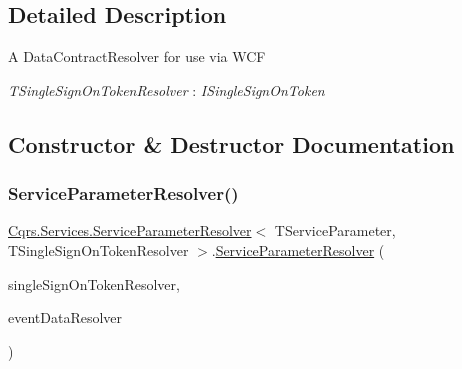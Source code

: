 \subsection{Detailed Description}
A Data\+Contract\+Resolver for use via W\+CF 

\begin{Desc}
\item[Type Constraints]\begin{description}
\item[{\em T\+Single\+Sign\+On\+Token\+Resolver} : {\em I\+Single\+Sign\+On\+Token}]\end{description}
\end{Desc}


\subsection{Constructor \& Destructor Documentation}
\mbox{\label{classCqrs_1_1Services_1_1ServiceParameterResolver_a635623bf86cf7b365a1b748dcc02daa8}} 
\subsubsection{\texorpdfstring{Service\+Parameter\+Resolver()}{ServiceParameterResolver()}}
{\footnotesize\ttfamily \hyperlink{classCqrs_1_1Services_1_1ServiceParameterResolver}{Cqrs.\+Services.\+Service\+Parameter\+Resolver}$<$ T\+Service\+Parameter, T\+Single\+Sign\+On\+Token\+Resolver $>$.\hyperlink{classCqrs_1_1Services_1_1ServiceParameterResolver}{Service\+Parameter\+Resolver} (\begin{DoxyParamCaption}\item[{\hyperlink{interfaceCqrs_1_1Services_1_1ISingleSignOnTokenResolver}{I\+Single\+Sign\+On\+Token\+Resolver}}]{single\+Sign\+On\+Token\+Resolver,  }\item[{\hyperlink{interfaceCqrs_1_1Services_1_1IEventDataResolver}{I\+Event\+Data\+Resolver}}]{event\+Data\+Resolver }\end{DoxyParamCaption})\hspace{0.3cm}{\ttfamily [protected]}}



